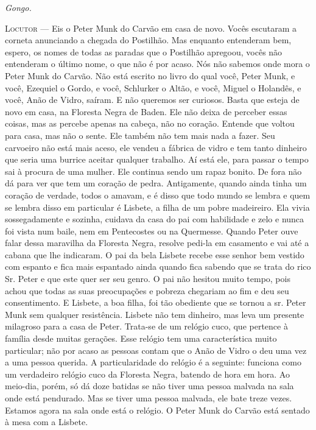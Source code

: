 \begin{myparindent}{0pt}
\begin{Parskip}
\emph{Gongo.}

\textsc{Locutor} --- Eis o Peter Munk do Carvão em casa de novo. Vocês escutaram a
corneta anunciando a chegada do Postilhão. Mas enquanto entenderam bem,
espero, os nomes de todas as paradas que o Postilhão apregoou, vocês não
entenderam o último nome, o que não é por acaso. Nós não sabemos onde
mora o Peter Munk do Carvão. Não está escrito no livro do qual você,
Peter Munk, e você, Ezequiel o Gordo, e você, Schlurker o Altão, e você,
Miguel o Holandês, e você, Anão de Vidro, saíram. E não queremos ser
curiosos. Basta que esteja de novo em casa, na Floresta Negra de Baden.
Ele não deixa de perceber essas coisas, mas as percebe apenas na cabeça,
não no coração. Entende que voltou para casa, mas não o sente. Ele
também não tem mais nada a fazer. Seu carvoeiro não está mais aceso, ele
vendeu a fábrica de vidro e tem tanto dinheiro que seria uma burrice
aceitar qualquer trabalho. Aí está ele, para passar o tempo sai à
procura de uma mulher. Ele continua sendo um rapaz bonito. De fora não
dá para ver que tem um coração de pedra. Antigamente, quando ainda tinha
um coração de verdade, todos o amavam, e é disso que todo mundo se
lembra e quem se lembra disso em particular é Lisbete, a filha de um
pobre madeireiro. Ela vivia sossegadamente e sozinha, cuidava da casa do
pai com habilidade e zelo e nunca foi vista num baile, nem em
Pentecostes ou na Quermesse. Quando Peter ouve falar dessa maravilha da
Floresta Negra, resolve pedi-la em casamento e vai até a cabana que lhe
indicaram. O pai da bela Lisbete recebe esse senhor bem vestido com
espanto e fica mais espantado ainda quando fica sabendo que se trata do
rico Sr. Peter e que este quer ser seu genro. O pai não hesitou muito
tempo, pois achou que todas as suas preocupações e pobreza chegariam ao
fim e deu seu consentimento. E Lisbete, a boa filha, foi tão obediente
que se tornou a sr. Peter Munk sem qualquer resistência. Lisbete não
tem dinheiro, mas leva um presente milagroso para a casa de Peter.
Trata-se de um relógio cuco, que pertence à família desde muitas
gerações. Esse relógio tem uma característica muito particular; não por
acaso as pessoas contam que o Anão de Vidro o deu uma vez a uma pessoa
querida. A particularidade do relógio é a seguinte: funciona como um
verdadeiro relógio cuco da Floresta Negra, batendo de hora em hora. Ao
meio-dia, porém, só dá doze batidas se não tiver uma pessoa malvada na
sala onde está pendurado. Mas se tiver uma pessoa malvada, ele bate
treze vezes. Estamos agora na sala onde está o relógio. O Peter Munk do
Carvão está sentado à mesa com a Lisbete.


\end{Parskip}
\end{myparindent}

